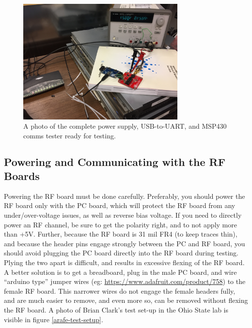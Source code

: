 \documentclass[letter,12pt]{article}
\begin{document}
\begin{figure}
\begin{centering}
\includegraphics[width=0.75\textwidth]{photos/Power_Comms.jpg}
\par\end{centering}
\caption{A photo of the complete power supply, USB-to-UART, and MSP430 comms tester ready for testing.}
\label{PC-ready-to-test}
\end{figure}

\subsection{Powering and Communicating with the RF Boards}

Powering the RF board must be done carefully. Preferably, you should power the RF board only with the PC board, which will protect the RF board from any under/over-voltage issues, as well as reverse bias voltage. If you need to directly power an RF channel, be sure to get the polarity right, and to not apply more than +5V. Further, because the RF board is 31 mil FR4 (to keep traces thin), and because the header pins engage strongly between the PC and RF board, you should avoid plugging the PC board directly into the RF board during testing. Plying the two apart is difficult, and results in excessive flexing of the RF board. A better solution is to get a breadboard, plug in the male PC board, and wire ``arduino type'' jumper wires (eg: \href{https://www.adafruit.com/product/758}{https://www.adafruit.com/product/758}) to the female RF board. This narrower wires do not engage the female headers fully, and are much easier to remove, and even more so, can be removed without flexing the RF board. A photo of Brian Clark's test set-up in the Ohio State lab is visible in figure \ref{arafe-test-setup}.
\end{document}
